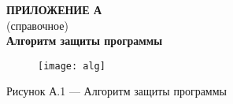 \newpage{}

\begin{center}
  \Large{\textbf{ПРИЛОЖЕНИЕ А}}\\
  \normalsize (справочное) \\ \textbf{Алгоритм защиты программы}
\end{center}
\label{AppendixA}

\begin{figure}[h!]
  \centering
  \texttt{[image: alg]}
\end{figure}
\begin{center}
  Рисунок А.1 --- Алгоритм защиты программы
\end{center}

\newpage{}



